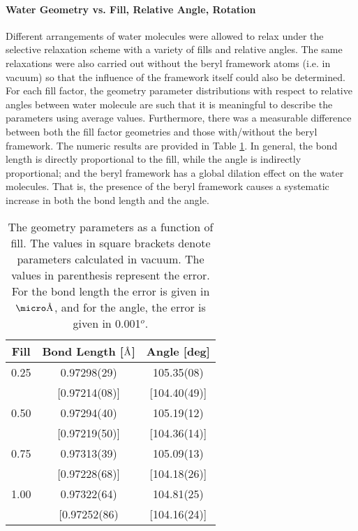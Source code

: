 \paragraph{Water Geometry vs. Fill, Relative Angle, Rotation} Different arrangements of water molecules were allowed to relax under the selective relaxation scheme with a variety of fills and relative angles. The same relaxations were also carried out without the beryl framework atoms (i.e. in vacuum) so that the influence of the framework itself could also be determined. For each fill factor, the geometry parameter distributions with respect to relative angles between water molecule are such that it is meaningful to describe the parameters using average values. Furthermore, there was a measurable difference between both the fill factor geometries and those with/without the beryl framework. The numeric results are provided in Table \ref{tab:geo_sum}. In general, the bond length is directly proportional to the fill, while the angle is indirectly proportional; and the beryl framework has a global dilation effect on the water molecules. That is, the presence of the beryl framework causes a systematic increase in both the bond length and the angle.

\begin{table}[]
    \centering
    \begin{tabular}{c|c|c}
      Fill & Bond Length [$\text{\normalfont\AA}$] & Angle [deg] \\
      \hline
      \hline
      0.25   & 0.97298(29)    & 105.35(08) \\
             & [0.97214(08)]  & [104.40(49)] \\
     \hline
      0.50   & 0.97294(40)    & 105.19(12) \\
             & [0.97219(50)]  & [104.36(14)] \\
     \hline
      0.75   & 0.97313(39)    & 105.09(13) \\
             & [0.97228(68)]  & [104.18(26)] \\
     \hline
      1.00   & 0.97322(64)    & 104.81(25) \\
             & [0.97252(86)   & [104.16(24)]
    \end{tabular}
    \caption{The geometry parameters as a function of fill. The values in square brackets denote parameters calculated in vacuum. The values in parenthesis represent the error. For the bond length the error is given in $\micro\angstrom$, and for the angle, the error is given in 0.001$^{o}$. }
    \label{tab:geo_sum}
\end{table}

